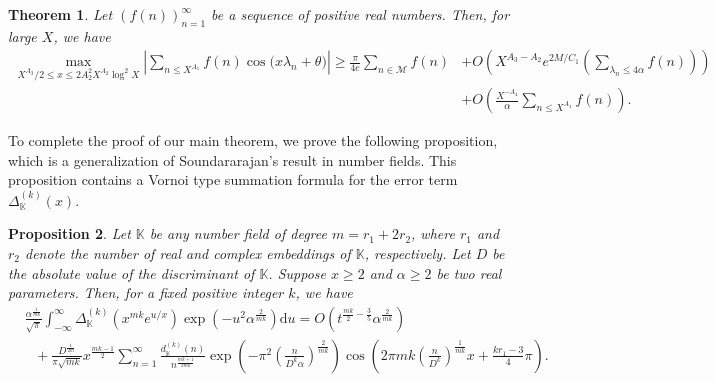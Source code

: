 \documentclass[reqno]{amsart}
\numberwithin{equation}{section}
\theoremstyle{plain}
\newtheorem{theorem}{Theorem}[section]
\newtheorem{proposition}[theorem]{Proposition}
\begin{document}
	\begin{theorem} \label{K-M Theorem}
		Let $(f(n))_{n=1}^{\infty}$ be a sequence of positive real numbers. Then, for large $X$, we have
		\begin{align*}
			\max_{X^{A_3}/2\leq x\leq 2A_2^2X^{A_2}\log^2 X}\left| \sum_{n\leq X^{A_1}} f(n) \cos\big(x\lambda_n+\theta\big)\right|\geq \frac{\pi}{4e}\sum_{n\in \mathcal{M}}f(n) &+ O\left( X^{A_3-A_2}e^{2M/C_1}\left(\sum_{\lambda_n\leq 4\alpha}f(n)\right)\right) \\
			& + O\left(\frac{X^{-A_4}}{\alpha}\sum_{n\leq X^{A_1}}f(n)\right).
		\end{align*}
	\end{theorem}
To complete the proof of our main  theorem, we prove the following proposition, which is a generalization of Soundararajan's result \cite{Sound} in number fields. This proposition contains a Vornoi type summation formula for the error term $\Delta_{\mathbb{K}}^{(k)}(x)$.
\begin{proposition} \label{Prop}
	Let $\mathbb{K}$ be any number field of degree $m=r_1+ 2r_2$, where $r_1$ and $r_2$ denote the number of real and complex embeddings of $\mathbb{K}$, respectively. Let $D$ be the absolute value of the discriminant of $\mathbb{K}$. Suppose $x\geq2$ and $\alpha\geq 2$ be two real parameters. Then, for a fixed positive integer $k$, we have
	\begin{align} \label{Proposition equation}
		\nonumber&\frac{\alpha^{\frac{1}{mk}}}{\sqrt{\pi}}\int_{-\infty}^{\infty}\Delta_{\mathbb{K}}^{(k)}\left(x^{mk}e^{u/x}\right) \exp\left(-u^2\alpha^{\frac{2}{mk}}\right)\mathrm{d}u = O\left( t^{\frac{mk}{2}-\frac{3}{5}}\alpha^{\frac{2}{mk}}\right)\\
		& \ \ \ +\frac{D^{\frac{1}{2m}}}{\pi\sqrt{mk}} x^{\frac{mk-1}{2}}\sum_{n=1}^{\infty}\frac{d_\mathbb{K}^{(k)}(n)}{n^{\frac{mk+1}{2mk}}} \exp\left(-\pi^2\left(\frac{n}{D^k \alpha}\right)^{\frac{2}{mk}}\right) \cos\left( 2\pi mk\left(\frac{n}{D^k}\right)^{\frac{1}{mk}}x + \frac{kr_1-3}{4}\pi\right).
	\end{align}
\end{proposition}
\end{document}
